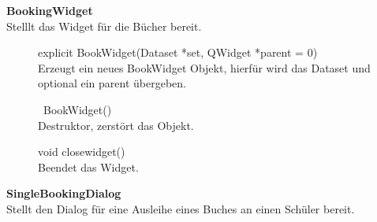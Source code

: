 \textbf{BookingWidget}\\
Stelllt das Widget für die Bücher bereit.
\begin{description}
	\item[ ] explicit BookWidget(Dataset *set, QWidget *parent = 0) \\
	Erzeugt ein neues BookWidget Objekt, hierfür wird das Dataset und optional ein parent übergeben.
  	\item[ ] ~BookWidget() \\
	Destruktor, zerstört das Objekt.
	\item[ ] void closewidget() \\
	Beendet das Widget.
\end{description}

\textbf{SingleBookingDialog}\\
Stellt den Dialog für eine Ausleihe eines Buches an einen Schüler bereit.
